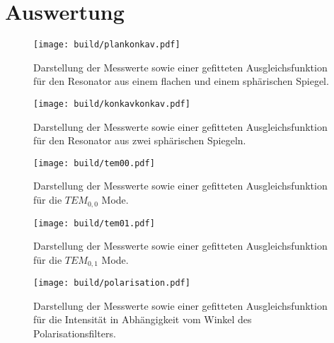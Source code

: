 \section{Auswertung}
\label{sec:Auswertung}

\begin{figure}
  \centering
  \texttt{[image: build/plankonkav.pdf]}
  \caption{Darstellung der Messwerte sowie einer gefitteten Ausgleichsfunktion für den
  Resonator aus einem flachen und einem sphärischen Spiegel.}
  \label{fig:plankonkav}
\end{figure}

\begin{figure}
  \centering
  \texttt{[image: build/konkavkonkav.pdf]}
  \caption{Darstellung der Messwerte sowie einer gefitteten Ausgleichsfunktion für den
  Resonator aus zwei sphärischen Spiegeln.}
  \label{fig:konkavkonkav}
\end{figure}

\begin{figure}
  \centering
  \texttt{[image: build/tem00.pdf]}
  \caption{Darstellung der Messwerte sowie einer gefitteten Ausgleichsfunktion für die $TEM_{0,0}$ Mode.}
  \label{fig:tem00}
\end{figure}

\begin{figure}
  \centering
  \texttt{[image: build/tem01.pdf]}
  \caption{Darstellung der Messwerte sowie einer gefitteten Ausgleichsfunktion für die $TEM_{0,1}$ Mode.}
  \label{fig:tem01}
\end{figure}


\begin{figure}
  \centering
  \texttt{[image: build/polarisation.pdf]}
  \caption{Darstellung der Messwerte sowie einer gefitteten Ausgleichsfunktion für die Intensität in
  Abhängigkeit vom Winkel des Polarisationsfilters.}
  \label{fig:polarisation}
\end{figure}

